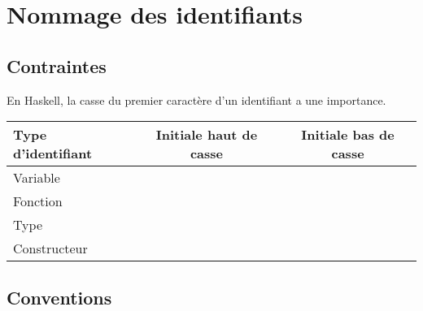 \section{Nommage des identifiants}
\label{identifiers}

\subsection{Contraintes}

En Haskell, la casse du premier caractère d'un identifiant a une importance.

\begin{tableau}
\label{tbl:naming-rules:summary}
\begin{tabularx}{\textwidth}{Xcc}
Type d'identifiant & Initiale haut de casse & Initiale bas de casse \\
\midrule
Variable       &    & \Y \\
Fonction       &    & \Y \\
Type           & \Y & \\
Constructeur   & \Y & \\
\end{tabularx}
\end{tableau}

\subsection{Conventions}
